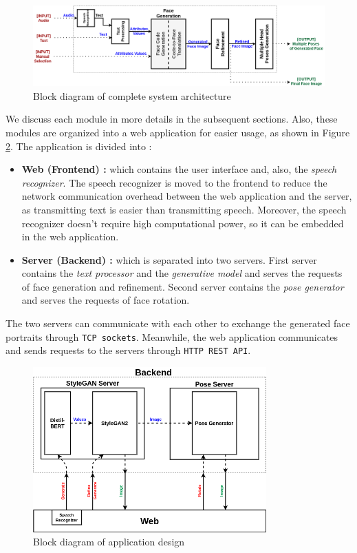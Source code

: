 \begin{figure}[H]
    \centering
    \includegraphics[width=\textwidth]{images/system-design.png}
    \caption{Block diagram of complete system architecture}
    \label{fig:system}
\end{figure}

\newpage

We discuss each module in more details in the subsequent sections. Also, these modules are organized into a web application for easier usage, as shown in Figure \ref{fig:app}. The application is divided into :
\begin{itemize}
    \item\textbf{ Web (Frontend) :} which contains the user interface and, also, the \emph{speech recognizer}. The speech recognizer is moved to the frontend to reduce the network communication overhead between the web application and the server, as transmitting text is easier than transmitting speech. Moreover, the speech recognizer doesn't require high computational power, so it can be embedded in the web application.
    \item \textbf{Server (Backend) :} which is separated into two servers. First server contains the \emph{text processor} and the \emph{generative model} and serves the requests of face generation and refinement. Second server contains the \emph{pose generator} and serves the requests of face rotation.
\end{itemize}

The two servers can communicate with each other to exchange the generated face portraits through \texttt{TCP sockets}. Meanwhile, the web application communicates and sends requests to the servers through \texttt{HTTP REST API}.

\begin{figure}[H]
    \centering
    \includegraphics[width=0.8\textwidth]{images/app-design.png}
    \caption{Block diagram of application design}
    \label{fig:app}
\end{figure}

